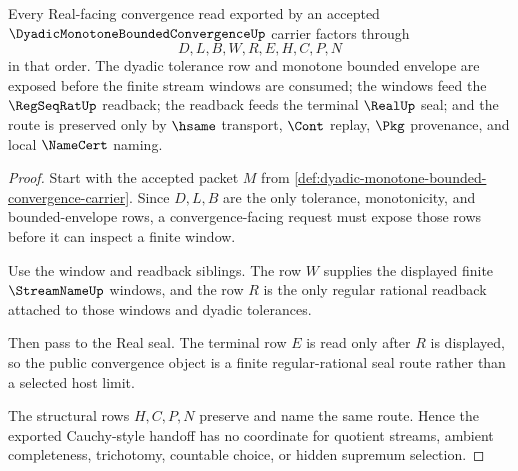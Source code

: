 \begin{theorem}
\label{thm:dyadic-monotone-bounded-convergence-cauchy-route}
Every Real-facing convergence read exported by an accepted $\DyadicMonotoneBoundedConvergenceUp$ carrier factors through
$$
D,L,B,W,R,E,H,C,P,N
$$
in that order. The dyadic tolerance row and monotone bounded envelope are exposed before the finite stream windows are consumed; the windows feed the $\RegSeqRatUp$ readback; the readback feeds the terminal $\RealUp$ seal; and the route is preserved only by $\hsame$ transport, $\Cont$ replay, $\Pkg$ provenance, and local $\NameCert$ naming.
\end{theorem}
\begin{proof}
Start with the accepted packet $M$ from \autoref{def:dyadic-monotone-bounded-convergence-carrier}. Since $D,L,B$ are the only tolerance, monotonicity, and bounded-envelope rows, a convergence-facing request must expose those rows before it can inspect a finite window.

Use the window and readback siblings. The row $W$ supplies the displayed finite $\StreamNameUp$ windows, and the row $R$ is the only regular rational readback attached to those windows and dyadic tolerances.

Then pass to the Real seal. The terminal row $E$ is read only after $R$ is displayed, so the public convergence object is a finite regular-rational seal route rather than a selected host limit.

The structural rows $H,C,P,N$ preserve and name the same route. Hence the exported Cauchy-style handoff has no coordinate for quotient streams, ambient completeness, trichotomy, countable choice, or hidden supremum selection.
\end{proof}

